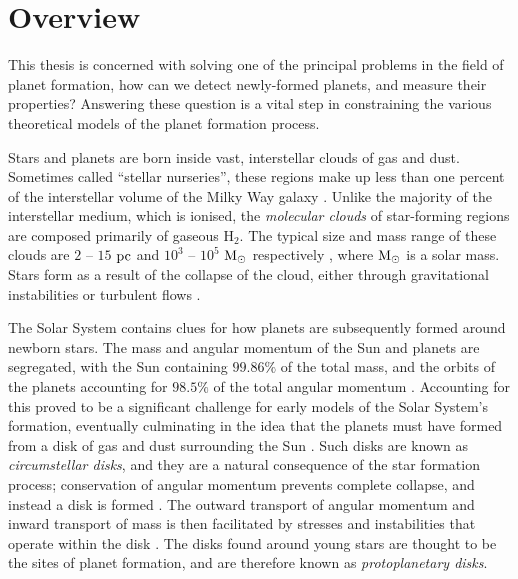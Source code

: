 \section{Overview}

This thesis is concerned with solving one of the principal problems in the field of planet formation, how can we detect newly-formed planets, and measure their properties?
Answering these question is a vital step in constraining the various theoretical models of the planet formation process.

Stars and planets are born inside vast, interstellar clouds of gas and dust.
Sometimes called ``stellar nurseries'', these regions make up less than one percent of the interstellar volume of the Milky Way galaxy \citep{ferriere2001}.
Unlike the majority of the interstellar medium, which is ionised, the \textit{molecular clouds} of star-forming regions are composed primarily of gaseous H$_2$.
The typical size and mass range of these clouds are $2$ -- $15$ $\rm{pc}$ and $10^3$ -- $10^5$ $\rm{M_\odot}$ respectively \citep{cambresy1999}, where $\rm{M_\odot}$ is a solar mass.
Stars form as a result of the collapse of the cloud, either through gravitational instabilities \citep{jeans1902} or turbulent flows \citep{larson1981}.

The Solar System contains clues for how planets are subsequently formed around newborn stars.
The mass and angular momentum of the Sun and planets are segregated, with the Sun containing $99.86 \%$ of the total mass, and the orbits of the planets accounting for $98.5 \%$ of the total angular momentum \citep[e.g.][]{woolfson2000}.
Accounting for this proved to be a significant challenge for early models of the Solar System's formation, eventually culminating in the idea that the planets must have formed from a disk of gas and dust surrounding the Sun \citep[see review by][]{edgeworth1949}.
Such disks are known as \textit{circumstellar disks}, and they are a natural consequence of the star formation process; conservation of angular momentum prevents complete collapse, and instead a disk is formed \citep{terebey1984,shu1987}.
The outward transport of angular momentum and inward transport of mass is then facilitated by stresses and instabilities that operate within the disk \citep{lynden-bell1974,pringle1981}.
The disks found around young stars are thought to be the sites of planet formation, and are therefore known as \textit{protoplanetary disks}.

